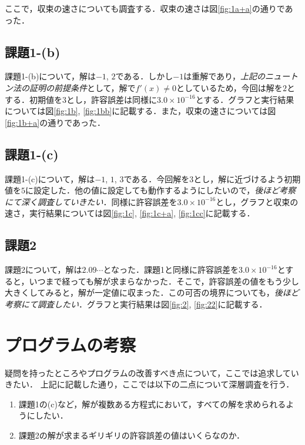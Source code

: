\documentclass[12pt]{jarticle}
\renewcommand  \[  {\begin{eqnarray}}
\renewcommand  \]  {\end{eqnarray}}
\begin{document}
ここで，収束の速さについても調査する．収束の速さは図\ref{fig:1a+a}の通りであった．

\subsection{課題1-(b)}
課題1-(b)について，解は$-1$, $2$である．しかし$-1$は重解であり，\emph{上記のニュートン法の証明の前提条件}として，解で$f'(x)\neq0$としているため，今回は解を$2$とする．初期値を$3$とし，許容誤差は同様に$3.0 \times 10^{-16}$とする．グラフと実行結果については図\ref{fig:1b}, \ref{fig:1bb}に記載する．また，収束の速さについては図\ref{fig:1b+a}の通りであった．

\subsection{課題1-(c)}
課題1-(c)について，解は$-1$, $1$, $3$である．今回解を$3$とし，解に近づけるよう初期値を$5$に設定した．他の値に設定しても動作するようにしたいので，\emph{後ほど考察にて深く調査していきたい}．同様に許容誤差を$3.0 \times 10^{-16}$とし，グラフと収束の速さ，実行結果については図\ref{fig:1c}, \ref{fig:1c+a}, \ref{fig:1cc}に記載する．

\subsection{課題2}
課題2について，解は$2.09\cdots$となった．課題1と同様に許容誤差を$3.0 \times 10^{-16}$とすると，いつまで経っても解が求まらなかった．そこで，許容誤差の値をもう少し大きくしてみると，解が一定値に収まった．この可否の境界についても，\emph{後ほど考察にて調査したい}．グラフと実行結果は図\ref{fig:2}, \ref{fig:22}に記載する．



\section{プログラムの考察}

疑問を持ったところやプログラムの改善すべき点について，ここでは追求していきたい．
上記に記載した通り，ここでは以下の二点について深層調査を行う．

\begin{enumerate}
\item 課題1の(c)など，解が複数ある方程式において，すべての解を求められるようにしたい．
\item 課題2の解が求まるギリギリの許容誤差の値はいくらなのか．
\end{enumerate}
\end{document}
